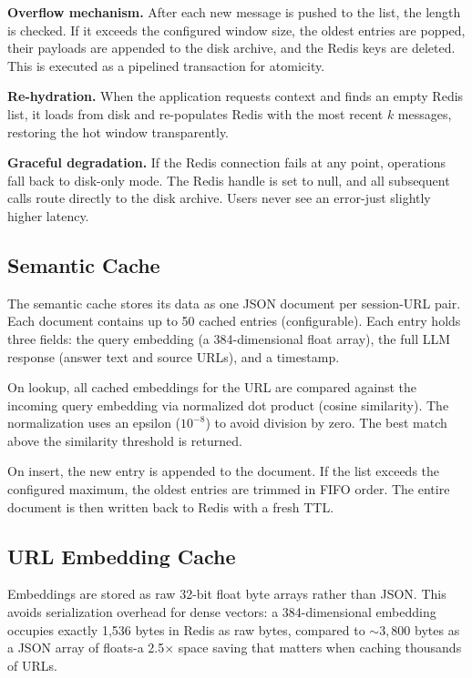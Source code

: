\documentclass[conference]{IEEEtran}
\begin{document}
\textbf{Overflow mechanism.} After each new message is pushed to the list, the length is checked. If it exceeds the configured window size, the oldest entries are popped, their payloads are appended to the disk archive, and the Redis keys are deleted. This is executed as a pipelined transaction for atomicity.

\textbf{Re-hydration.} When the application requests context and finds an empty Redis list, it loads from disk and re-populates Redis with the most recent $k$ messages, restoring the hot window transparently.

\textbf{Graceful degradation.} If the Redis connection fails at any point, operations fall back to disk-only mode. The Redis handle is set to null, and all subsequent calls route directly to the disk archive. Users never see an error-just slightly higher latency.

\subsection{Semantic Cache}

The semantic cache stores its data as one JSON document per session-URL pair. Each document contains up to 50 cached entries (configurable). Each entry holds three fields: the query embedding (a 384-dimensional float array), the full LLM response (answer text and source URLs), and a timestamp.

On lookup, all cached embeddings for the URL are compared against the incoming query embedding via normalized dot product (cosine similarity). The normalization uses an epsilon ($10^{-8}$) to avoid division by zero. The best match above the similarity threshold is returned.

On insert, the new entry is appended to the document. If the list exceeds the configured maximum, the oldest entries are trimmed in FIFO order. The entire document is then written back to Redis with a fresh TTL.

\subsection{URL Embedding Cache}

Embeddings are stored as raw 32-bit float byte arrays rather than JSON. This avoids serialization overhead for dense vectors: a 384-dimensional embedding occupies exactly 1{,}536 bytes in Redis as raw bytes, compared to ${\sim}3{,}800$ bytes as a JSON array of floats-a 2.5$\times$ space saving that matters when caching thousands of URLs.
\end{document}
